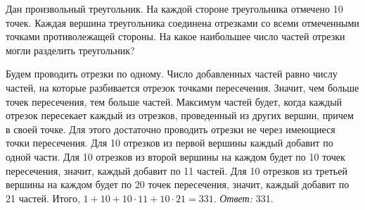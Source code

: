 \problem
Дан произвольный треугольник.
На каждой стороне треугольника отмечено 10 точек.
Каждая вершина треугольника соединена отрезками со всеми отмеченными точками
противолежащей стороны.
На какое наибольшее число частей отрезки могли разделить треугольник?

\solution
Будем проводить отрезки по одному.
Число добавленных частей равно числу частей, на которые разбивается отрезок
точками пересечения.
Значит, чем больше точек пересечения, тем больше частей.
Максимум частей будет, когда каждый отрезок пересекает каждый из отрезков,
проведенный из других вершин, причем в своей точке.
Для этого достаточно проводить отрезки не через имеющиеся точки пересечения.
Для 10 отрезков из первой вершины каждый добавит по одной части.
Для 10 отрезков из второй вершины на каждом будет по 10 точек пересечения,
значит, каждый добавит по 11 частей.
Для 10 отрезков из третьей вершины на каждом будет по 20 точек пересечения,
значит, каждый добавит по 21 частей.
Итого, $1 + 10 + 10 \cdot 11 + 10 \cdot 21 = 331$.
\emph{Ответ:} 331.

\endproblem
